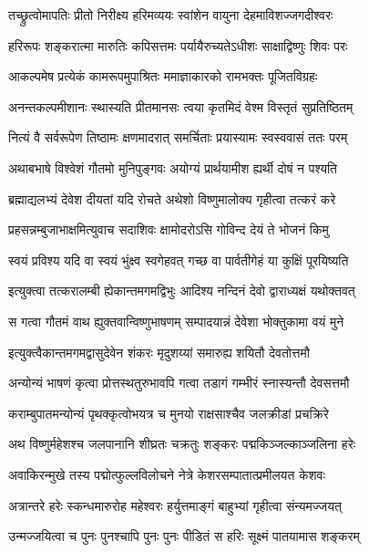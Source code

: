 \twolineshloka
{तच्छ्रुत्वोमापतिः प्रीतो निरीक्ष्य हरिमव्ययः}
{स्वांशेन वायुना देहमाविशज्जगदीश्वरः}%

\twolineshloka
{हरिरूपः शङ्करात्मा मारुतिः कपिसत्तमः}
{पर्यायैरुच्यतेऽधीशः साक्षाद्विष्णुः शिवः परः}%

\twolineshloka
{आकल्पमेष प्रत्येकं कामरूपमुपाश्रितः}
{ममाज्ञाकारको रामभक्तः पूजितविग्रहः}%

\twolineshloka
{अनन्तकल्पमीशानः स्थास्यति प्रीतमानसः}
{त्वया कृतमिदं वेश्म विस्तृतं सुप्रतिष्ठितम्}%

\twolineshloka
{नित्यं वै सर्वरूपेण तिष्ठामः क्षणमादरात्}
{समर्चिताः प्रयास्यामः स्वस्ववासं ततः परम्}%

\twolineshloka
{अथाबभाषे विश्वेशं गौतमो मुनिपुङ्गवः}
{अयोग्यं प्रार्थयामीश ह्यर्थी दोषं न पश्यति}%

\twolineshloka
{ब्रह्माद्यलभ्यं देवेश दीयतां यदि रोचते}
{अथेशो विष्णुमालोक्य गृहीत्वा तत्करं करे}%

\twolineshloka
{प्रहसन्नम्बुजाभाक्षमित्युवाच सदाशिवः}
{क्षामोदरोऽसि गोविन्द देयं ते भोजनं किमु}%

\twolineshloka
{स्वयं प्रविश्य यदि वा स्वयं भुंक्ष्व स्वगेहवत्}
{गच्छ वा पार्वतीगेहं या कुक्षिं पूरयिष्यति}%

\twolineshloka
{इत्युक्त्वा तत्करालम्बी ह्येकान्तमगमद्विभुः}
{आदिश्य नन्दिनं देवो द्वाराध्यक्षं यथोक्तवत्}%

\twolineshloka
{स गत्वा गौतमं वाथ ह्युक्तवान्विष्णुभाषणम्}
{सम्पादयान्नं देवेशा भोक्तुकामा वयं मुने}%

\twolineshloka
{इत्युक्त्वैकान्तमगमद्वासुदेवेन शंकरः}
{मृदुशय्यां समारुह्य शयितौ देवतोत्तमौ}%

\twolineshloka
{अन्योन्यं भाषणं कृत्वा प्रोत्तस्थतुरुभावपि}
{गत्वा तडागं गम्भीरं स्नास्यन्तौ देवसत्तमौ}%

\twolineshloka
{कराम्बुपातमन्योन्यं पृथक्कृत्वोभयत्र च}
{मुनयो राक्षसाश्चैव जलक्रीडां प्रचक्रिरे}%

\twolineshloka
{अथ विष्णुर्महेशश्च जलपानानि शीघ्रतः}
{चक्रतुः शङ्करः पद्मकिञ्जल्काञ्जलिना हरेः}%

\twolineshloka
{अवाकिरन्मुखे तस्य पद्मोत्फुल्लविलोचने}
{नेत्रे केशरसम्पातात्प्रमीलयत केशवः}%

\twolineshloka
{अत्रान्तरे हरेः स्कन्धमारुरोह महेश्वरः}
{हर्युत्तमाङ्गं बाहुभ्यां गृहीत्वा संन्यमज्जयत्}%

\twolineshloka
{उन्मज्जयित्वा च पुनः पुनश्चापि पुनः पुनः}
{पीडितं स हरिः सूक्ष्मं पातयामास शङ्करम्}%

